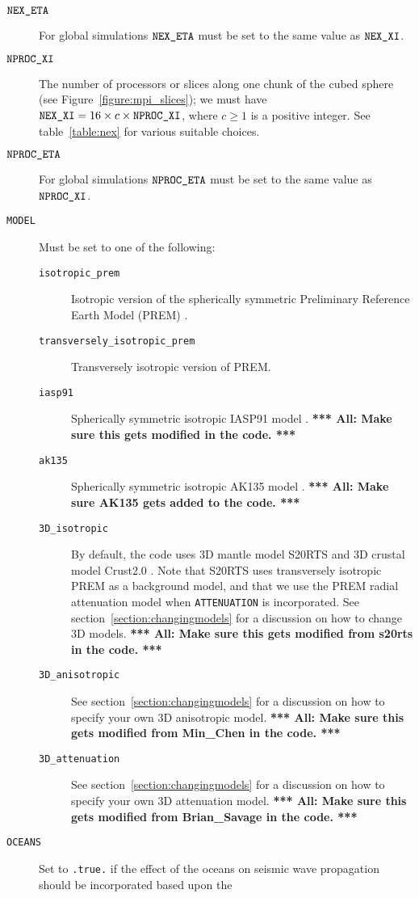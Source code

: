 \documentclass[onecolumn]{article}
\newcommand{\toall}[1]{\textbf{*** All: #1 ***}}
\newcommand{\nexxi}{\mbox{\texttt{NEX\_XI}}}
\newcommand{\nexeta}{\mbox{\texttt{NEX\_ETA}}}
\newcommand{\nprocxi}{\mbox{\texttt{NPROC\_XI}}}
\newcommand{\nproceta}{\mbox{\texttt{NPROC\_ETA}}}
\begin{document}
\begin{description}
\item[$\nexeta$] For global simulations $\nexeta$
must be set to the same value as $\nexxi$.
\item[$\nprocxi$] The number of processors or slices along one
chunk of the cubed sphere (see Figure~\ref{figure:mpi_slices});
we must have $\nexxi=16\times c\times \nprocxi$, where
$c\ge1$ is a positive integer.
See table~\ref{table:nex} for various suitable choices.
\item[$\nproceta$] For global simulations $\nproceta$
must be set to the same value as $\nprocxi$.
\item[\texttt{MODEL}] Must be set to one of the following:
\begin{description}
\item[\texttt{isotropic\_prem}] Isotropic version of the spherically symmetric
Preliminary Reference Earth Model (PREM) \cite{DzAn81}.
\item[\texttt{transversely\_isotropic\_prem}] Transversely
isotropic version of PREM.
\item[\texttt{iasp91}] Spherically symmetric isotropic IASP91 model \cite{KeEn91}.
\toall{Make sure this gets modified in the code.}
\item[\texttt{ak135}] Spherically symmetric isotropic AK135 model \cite{KeEnBu95}.
\toall{Make sure AK135 gets added to the code.}
\item[\texttt{3D\_isotropic}] By default,
the code uses 3D mantle model S20RTS \cite{ritsemaetal1999}
and 3D crustal model Crust2.0 \cite{BaLaMa00}.
Note that S20RTS uses transversely isotropic PREM as a background model,
and that we use the PREM radial attenuation model when
\texttt{ATTENUATION} is incorporated.
See section~\ref{section:changingmodels} for a discussion on
how to change 3D models.
\toall{Make sure this gets modified from s20rts in the code.}
\item[\texttt{3D\_anisotropic}] 
See section~\ref{section:changingmodels} for a discussion on
how to specify your own 3D anisotropic model.
\toall{Make sure this gets modified from Min\_Chen in the code.}
\item[\texttt{3D\_attenuation}] 
See section~\ref{section:changingmodels} for a discussion on
how to specify your own 3D attenuation model.
\toall{Make sure this gets modified from Brian\_Savage in the code.}
\end{description}
\item[\texttt{OCEANS}] Set to \texttt{.true.} if the effect of the oceans
on seismic wave propagation should be incorporated based upon the

\end{description}
\end{document}

